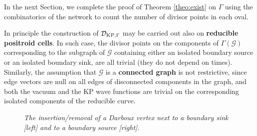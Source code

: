 \documentclass[11pt]{amsart}
\theoremstyle{plain}
\numberwithin{equation}{section}
\def \DKP {{\mathcal D}_{\textup{\scriptsize KP},\Gamma}}
\begin{document}
In the next Section, we complete the proof of Theorem \ref{theo:exist} on $\Gamma$ using the combinatorics of the network to count the number of divisor points in each oval. 

In principle the construction of $\DKP$ may be carried out also on \textbf{reducible positroid cells}. 
In such case, the divisor points on the components of $\Gamma(\mathcal G)$ corresponding to the subgraph of $\mathcal G$ containing either an isolated boundary source or an isolated boundary sink, are all trivial (they do not depend on times).
Similarly, the assumption that  $\mathcal G$  is a \textbf{connected graph} is not restrictive, since edge vectors are null on all edges of disconnected components in the graph, and both the vacuum and the KP wave functions are trivial on the corresponding isolated components of the reducible curve.

\begin{figure}%
	\vspace{-.5 truecm}
  \caption{\small{\sl The insertion/removal of a Darboux vertex next to a boundary sink [left] and to a boundary source [right].}\label{fig:Darboux}}
\end{figure}
\end{document}
